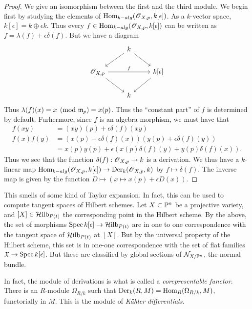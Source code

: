 \documentclass[11pt, english]{article}
\begin{document}
\begin{proof}
We give an isomorphism between the first and the third module. We begin first by studying the elements of $\operatorname{Hom}_{k-alg}(\operatorname{\mathscr{O}}_{X,p},k[\epsilon])$. As a $k$-vector space, $k[\epsilon] = k \oplus \epsilon k$. Thus every $f \in \operatorname{Hom}_{k-alg}(\operatorname{\mathscr{O}}_{X,p},k[\epsilon])$ can be written as $f = \lambda(f) + \epsilon \delta(f)$. But we have a diagram
\[
\begin{tikzcd}
{}& k \arrow{dr} \arrow{dl} & \\
\OO_{X,p} \arrow{dr} \arrow{rr}{f} & & k[\epsilon] \arrow{dl} \\
 & k
\end{tikzcd}
\]
Thus $\lambda(f)(x) = x \pmod {\mathfrak{m}_p}  = x(p)$. Thus the ``constant part'' of $f$ is determined by default. Furhermore, since $f$ is an algebra morphism, we must have that
\begin{align*}
  f(xy) &= (xy)(p) + \epsilon \delta(f)(xy) \\
f(x)f(y) &= (x(p)+\epsilon \delta(f)(x))(y(p)+\epsilon \delta(f)(y)) \\
&= x(p)y(p) + \epsilon \left( x(p) \delta(f)(y) + y(p) \delta(f)(x)\right).
\end{align*}
Thus we see that the function $\delta(f):\operatorname{\mathscr{O}}_{X,p} \to k$ is a derivation. We thus have a $k$-linear map $\operatorname{Hom}_{k-alg}(\operatorname{\mathscr{O}}_{X,p},k[\epsilon]) \to \operatorname{Der}_k(\operatorname{\mathscr{O}}_{X,p},k)$ by $f \mapsto \delta(f)$. The inverse map is given by the function $D \mapsto {(x \mapsto x(p) + \epsilon D(x))}$.
\end{proof}

\begin{remark}
This smells of some kind of Taylor expansion. In fact, this can be used to compute tangent spaces of Hilbert schemes. Let $X \subset \mathbb{P}^n$ be a projective variety, and $[X] \in \mathcal{H}\mathrm{ilb}_{P(t)}$ the corresponding point in the Hilbert scheme. By the above, the set of morphisms $\operatorname{Spec} k[\epsilon] \to \mathcal{H}\mathrm{ilb}_{P(t)}$ are in one to one correspondence with the tangent space of $\mathcal{H}\mathrm{ilb}_{P(t)}$ at $[X]$. But by the universal property of the Hilbert scheme, this set is in one-one correspondence with the set of flat families $\mathfrak X \to \operatorname{Spec} k[\epsilon]$. But these are classified by global sections of $\mathcal N_{X/\mathbb{P}^n}$, the normal bundle.
\end{remark}

In fact, the module of derivations is what is called a \emph{corepresentable functor}. There is an $R$-module $\Omega_{R/k}$ such that $\operatorname{Der}_k(R,M)=\operatorname{Hom}_R(\Omega_{R/k},M)$, functorially in $M$. This is the module of \emph{Kähler differentials}.
\end{document}

